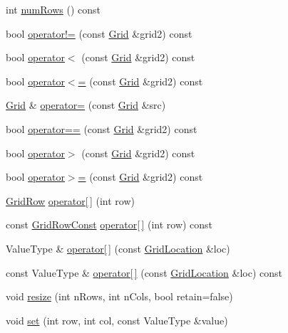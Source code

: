 \begin{DoxyCompactItemize}
int \mbox{\hyperlink{classGrid_a00b7e69dd5c43e42cc91db26c459ad8b}{num\+Rows}} () const
\item 
bool \mbox{\hyperlink{classGrid_a9426f59b6352933578b4294bc9d221bc}{operator!=}} (const \mbox{\hyperlink{classGrid}{Grid}} \&grid2) const
\item 
bool \mbox{\hyperlink{classGrid_aefee1b5c152f0cf1b9537b2542f0fccd}{operator$<$}} (const \mbox{\hyperlink{classGrid}{Grid}} \&grid2) const
\item 
bool \mbox{\hyperlink{classGrid_adc972513ba66ac1e3e5847abe6e8666c}{operator$<$=}} (const \mbox{\hyperlink{classGrid}{Grid}} \&grid2) const
\item 
\mbox{\hyperlink{classGrid}{Grid}} \& \mbox{\hyperlink{classGrid_a4e17188bcb4ffb95efef313dcccc6813}{operator=}} (const \mbox{\hyperlink{classGrid}{Grid}} \&src)
\item 
bool \mbox{\hyperlink{classGrid_ae321d29c4eab96f54c2f86929a345e2b}{operator==}} (const \mbox{\hyperlink{classGrid}{Grid}} \&grid2) const
\item 
bool \mbox{\hyperlink{classGrid_aa2d6af2768a176d9ba044cf34087d766}{operator$>$}} (const \mbox{\hyperlink{classGrid}{Grid}} \&grid2) const
\item 
bool \mbox{\hyperlink{classGrid_a21431c500035c200656a8d67e96531c7}{operator$>$=}} (const \mbox{\hyperlink{classGrid}{Grid}} \&grid2) const
\item 
\mbox{\hyperlink{classGrid_1_1GridRow}{Grid\+Row}} \mbox{\hyperlink{classGrid_aa62a62fb923c387dbec19d9559fea429}{operator\mbox{[}$\,$\mbox{]}}} (int row)
\item 
const \mbox{\hyperlink{classGrid_1_1GridRowConst}{Grid\+Row\+Const}} \mbox{\hyperlink{classGrid_a8b881f7fb1e524d4cf2766bde140eeb1}{operator\mbox{[}$\,$\mbox{]}}} (int row) const
\item 
Value\+Type \& \mbox{\hyperlink{classGrid_afcc1243cd81603e13b8f223f0ceabe96}{operator\mbox{[}$\,$\mbox{]}}} (const \mbox{\hyperlink{structGridLocation}{Grid\+Location}} \&loc)
\item 
const Value\+Type \& \mbox{\hyperlink{classGrid_a914315640e381831ab30403063205359}{operator\mbox{[}$\,$\mbox{]}}} (const \mbox{\hyperlink{structGridLocation}{Grid\+Location}} \&loc) const
\item 
void \mbox{\hyperlink{classGrid_ace38e4e9ed81ae4ec651e4db9ab09db0}{resize}} (int n\+Rows, int n\+Cols, bool retain=false)
\item 
void \mbox{\hyperlink{classGrid_a6f5cee26d171f36d280a15c51332efc2}{set}} (int row, int col, const Value\+Type \&value)

\end{DoxyCompactItemize}
